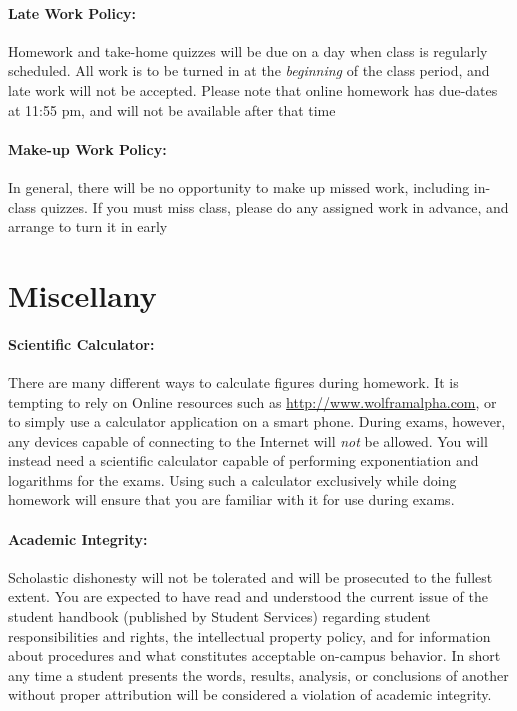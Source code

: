 \documentclass[12pt, letterpaper]{article}
\begin{document}
\paragraph{Late Work Policy:}
Homework and take-home quizzes will be due on a day when class is regularly scheduled. All work is to be turned in at the \emph{beginning} of the class period, and late work will not be accepted. Please note that online homework has due-dates at 11:55 pm, and will not be available after that time

\paragraph{Make-up Work Policy:}
In general, there will be no opportunity to make up missed work, including in-class quizzes. If you must miss class, please do any assigned work in advance, and arrange to turn it in early

\section*{Miscellany}

\paragraph{Scientific Calculator:}
There are many different ways to calculate figures during homework. It is tempting to rely on Online resources such as \href{http://www.wolframalpha.com}{http://www.wolframalpha.com}, or to simply use a calculator application on a smart phone. During exams, however, any devices capable of connecting to the Internet will \emph{not} be allowed. You will instead need a scientific calculator capable of performing exponentiation and logarithms for the exams. Using such a calculator exclusively while doing homework will ensure that you are familiar with it for use during exams.

\paragraph{Academic Integrity:}
Scholastic dishonesty will not be tolerated and will be prosecuted to the fullest extent. You are expected to have read and understood the current issue of the student handbook (published by Student Services) regarding student responsibilities and rights, the intellectual property policy, and for information about procedures and what constitutes acceptable on-campus behavior. In short any time a student presents the words, results, analysis, or conclusions of another without proper attribution will be considered a violation of academic integrity.
\end{document}
